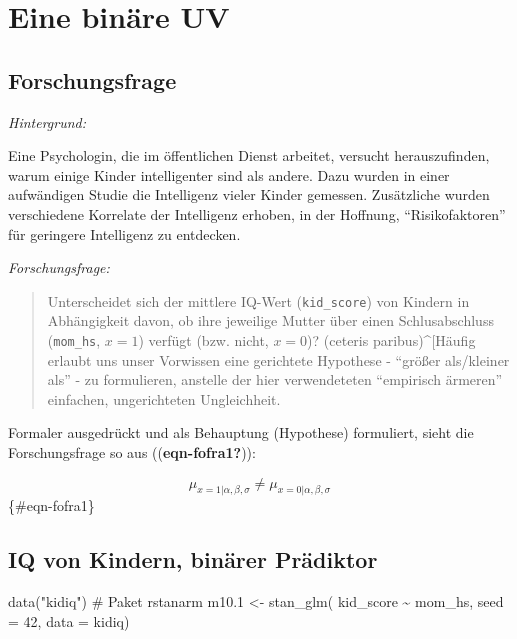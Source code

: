 \documentclass[
  a4paper,
  DIV=11]{scrreprt}
\newenvironment{Shaded}{\begin{snugshade}}{\end{snugshade}}
\newcommand{\AttributeTok}[1]{\textcolor[rgb]{0.40,0.45,0.13}{#1}}
\newcommand{\CommentTok}[1]{\textcolor[rgb]{0.37,0.37,0.37}{#1}}
\newcommand{\DecValTok}[1]{\textcolor[rgb]{0.68,0.00,0.00}{#1}}
\newcommand{\FloatTok}[1]{\textcolor[rgb]{0.68,0.00,0.00}{#1}}
\newcommand{\FunctionTok}[1]{\textcolor[rgb]{0.28,0.35,0.67}{#1}}
\newcommand{\NormalTok}[1]{\textcolor[rgb]{0.00,0.23,0.31}{#1}}
\newcommand{\OtherTok}[1]{\textcolor[rgb]{0.00,0.23,0.31}{#1}}
\newcommand{\SpecialCharTok}[1]{\textcolor[rgb]{0.37,0.37,0.37}{#1}}
\newcommand{\StringTok}[1]{\textcolor[rgb]{0.13,0.47,0.30}{#1}}
\theoremstyle{definition}
\theoremstyle{remark}
\begin{document}
\hypertarget{eine-binuxe4re-uv}{%
\section{Eine binäre UV}\label{eine-binuxe4re-uv}}

\hypertarget{forschungsfrage}{%
\subsection{Forschungsfrage}\label{forschungsfrage}}

\emph{Hintergrund:}

Eine Psychologin, die im öffentlichen Dienst arbeitet, versucht
herauszufinden, warum einige Kinder intelligenter sind als andere. Dazu
wurden in einer aufwändigen Studie die Intelligenz vieler Kinder
gemessen. Zusätzliche wurden verschiedene Korrelate der Intelligenz
erhoben, in der Hoffnung, ``Risikofaktoren'' für geringere Intelligenz
zu entdecken.

\emph{Forschungsfrage:}

\begin{quote}
Unterscheidet sich der mittlere IQ-Wert (\texttt{kid\_score}) von
Kindern in Abhängigkeit davon, ob ihre jeweilige Mutter über einen
Schlusabschluss (\texttt{mom\_hs}, \(x=1\)) verfügt (bzw. nicht,
\(x=0\))? (ceteris paribus)\^{}{[}Häufig erlaubt uns unser Vorwissen
eine gerichtete Hypothese - ``größer als/kleiner als'' - zu formulieren,
anstelle der hier verwendeteten ``empirisch ärmeren'' einfachen,
ungerichteten Ungleichheit.
\end{quote}

Formaler ausgedrückt und als Behauptung (Hypothese) formuliert, sieht
die Forschungsfrage so aus ((\textbf{eqn-fofra1?})):

\[\mu_{x=1|\alpha, \beta, \sigma} \ne \mu_{x=0|\alpha, \beta, \sigma}\]\{\#eqn-fofra1\}

\hypertarget{iq-von-kindern-binuxe4rer-pruxe4diktor}{%
\subsection{IQ von Kindern, binärer
Prädiktor}\label{iq-von-kindern-binuxe4rer-pruxe4diktor}}

\begin{Shaded}
\begin{Highlighting}[]
\FunctionTok{data}\NormalTok{(}\StringTok{"kidiq"}\NormalTok{)  }\CommentTok{\# Paket rstanarm}
\NormalTok{m10}\FloatTok{.1} \OtherTok{\textless{}{-}} \FunctionTok{stan\_glm}\NormalTok{(}
\NormalTok{  kid\_score }\SpecialCharTok{\textasciitilde{}}\NormalTok{ mom\_hs, }
  \AttributeTok{seed =} \DecValTok{42}\NormalTok{,}
  \AttributeTok{data =}\NormalTok{ kidiq)}
\end{Highlighting}
\end{Shaded}
\end{document}
